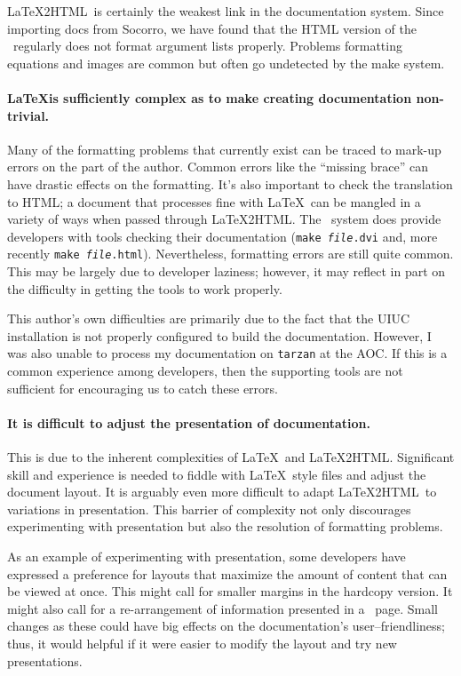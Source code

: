\LaTeX2HTML\ is certainly the weakest link in the documentation
system.   Since importing docs from Socorro, we have found that
the HTML version of the \ regularly does not format
argument lists properly.  Problems formatting equations and images are
common but often go undetected by the make system.  

\paragraph{\LaTeX is sufficiently complex as to make creating
documentation non-trivial.}  Many of the formatting problems that
currently exist can be traced to mark-up errors on the part of the
author.  Common errors like the ``missing brace'' can have drastic
effects on the formatting.  It's also important to check the
translation to HTML; a document that processes fine with \LaTeX\ can
be mangled in a variety of ways when passed through \LaTeX2HTML.  The
\aipspp\ system does provide developers with tools checking their
documentation ({\tt make {\it file}.dvi} and, more recently {\tt make
{\it file}.html}).  Nevertheless, formatting errors are still quite
common.  This may be largely due to developer laziness; however, it
may reflect in part on the difficulty in getting the tools to work
properly.

This author's own difficulties are primarily due to the fact that the
UIUC installation is not properly configured to build the
documentation.  However, I was also unable to process my documentation
on {\tt tarzan} at the AOC.  If this is a common experience among
developers, then the supporting tools are not sufficient for
encouraging us to catch these errors.  

\paragraph{It is difficult to adjust the presentation of
documentation.}  This is due to the inherent complexities of \LaTeX\
and \LaTeX2HTML.  Significant skill and experience is needed to
fiddle with \LaTeX\ style files and adjust the document layout.  It is
arguably even more difficult to adapt \LaTeX2HTML\ to variations in
presentation.  This barrier of complexity not only discourages
experimenting with presentation but also the resolution of formatting
problems.  

As an example of experimenting with presentation, some developers have
expressed a preference for layouts that maximize the amount of content
that can be viewed at once.  This might call for smaller margins in
the hardcopy version.  It might also call for a re-arrangement of
information presented in a \refman\ page.  Small changes as these
could have big effects on the documentation's user--friendliness;
thus, it would helpful if it were easier to modify the layout and try
new presentations.

